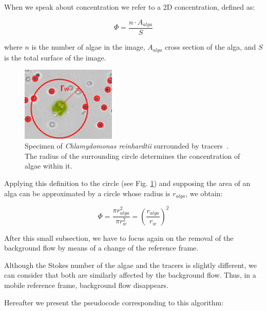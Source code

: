 When we speak about concentration we refer to a 2D concentration, defined as:

\begin{equation}
\Phi = \frac{n \cdot A_{alga}}{S}
\label{concentration}
\end{equation}

where $n$ is the number of algae in the image, $A_{alga}$ cross section of the alga, and $S$ is the total surface of the image.

\begin{figure}[H]
	\centering
	\includegraphics[width=0.4\textwidth]{archivos/concentration_circle.png}
	\caption{Specimen of \textit{Chlamydomonas reinhardtii} surrounded by tracers~\cite{chlamy_circ}. The radius of the surrounding circle determines the concentration of algae within it.}
	\label{concentration_circle}
\end{figure}

Applying this definition to the circle (see Fig. \ref{concentration_circle}) and supposing the area of an alga can be approximated by a circle whose radius is $r_{alga}$, we obtain:

\begin{equation}
\Phi = \frac{\pi r_{alga}^2}{\pi r_w^2} = \left(\frac{r_{alga}}{r_w}\right)^2
\label{conc_circle}
\end{equation}

After this small subsection, we have to focus again on the removal of the background flow by means of a change of the reference frame.

Although the Stokes number of the algae and the tracers is slightly different, we can consider that both are similarly affected by the background flow. Thus, in a mobile reference frame, background flow disappears.

Hereafter we present the pseudocode corresponding to this algorithm:

